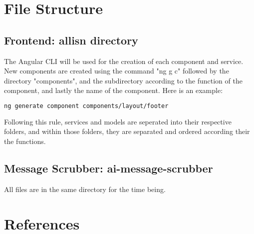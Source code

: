 \documentclass[11pt]{article}
\begin{document}

\section{File Structure}
\subsection{Frontend: allisn directory}

The Angular CLI will be used for the creation of each component and service. New components are created using the command "ng g c" followed by the directory "components", and the subdirectory according to the function of the component, and lastly the name of the component. Here is an example:

\begin{lstlisting}[language=bash]
ng generate component components/layout/footer
\end{lstlisting}
Following this rule, services and models are seperated into their respective folders, and within those folders, they are separated and ordered according their the functions.

\subsection{Message Scrubber: ai-message-scrubber}

All files are in the same directory for the time being.

\section{References}


\end{document}
